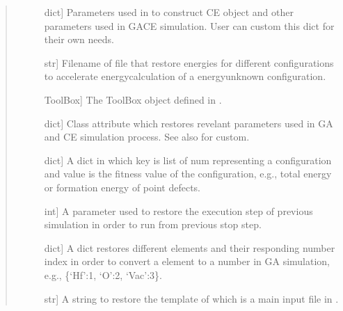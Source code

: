 \documentclass[letterpaper,10pt,english]{sphinxmanual}
\begin{document}
\begin{fulllineitems}
\begin{quote}
\begin{description}
\begin{description}
\item[{}] \leavevmode{[}dict{]}
\sphinxAtStartPar
Parameters used in to construct CE object and other parameters used
in GACE simulation. User can custom this dict for their own needs.

\item[{}] \leavevmode{[}str{]}
\sphinxAtStartPar
Filename of file that restore energies for different configurations
to accelerate energy\sphinxhyphen{}calculation of a energy\sphinxhyphen{}unknown configuration.

\item[{}] \leavevmode{[}ToolBox{]}
\sphinxAtStartPar
The ToolBox object defined in .

\item[{}] \leavevmode{[}dict{]}
\sphinxAtStartPar
Class attribute which restores revelant parameters used in GA and
CE simulation process. See also  for custom.

\item[{}] \leavevmode{[}dict{]}
\sphinxAtStartPar
A dict in which key is list of num representing a configuration and
value is the fitness value of the configuration, e.g., total energy or
formation energy of point defects.

\item[{}] \leavevmode{[}int{]}
\sphinxAtStartPar
A parameter used to restore the execution step of previous simulation
in order to run from previous stop step.

\item[{}] \leavevmode{[}dict{]}
\sphinxAtStartPar
A dict restores different elements and their responding number index
in order to convert a element to a number in GA simulation, e.g.,
\{‘Hf’:1, ‘O’:2, ‘Vac’:3\}.

\item[{}] \leavevmode{[}str{]}
\sphinxAtStartPar
A string to restore the template of  which is a main
input file in .

\end{description}

\end{description}\end{quote}


\end{fulllineitems}
\end{document}
